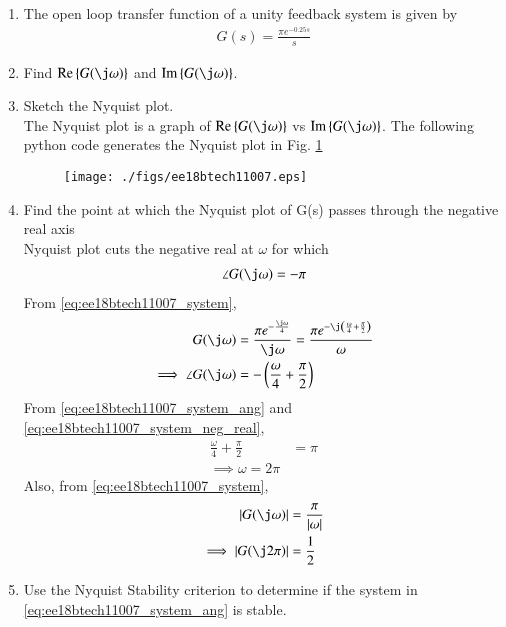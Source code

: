 \begin{enumerate}[label=\thesection.\arabic*.,ref=\thesection.\theenumi]
\item The open loop transfer function of a unity feedback system is given by
\begin{align}
\label{eq:ee18btech11007_system}
 G(s)=\frac{\pi e^{-0.25s}}{s}
\end{align}
\item Find $\text{Re} \cbrak{G(\j \omega)}$ and $\text{Im} \cbrak{G(\j \omega)}$.
\item Sketch the Nyquist plot.
\\
\solution The Nyquist plot is a graph of $\text{Re} \cbrak{G(\j \omega)}$  vs $\text{Im} \cbrak{G(\j \omega)}$.
The following python code generates the Nyquist plot in Fig.  \ref{fig:ee18btech11007}
%
\begin{figure}[!h]
  \texttt{[image: ./figs/ee18btech11007.eps]}
  \caption{}
  \label{fig:ee18btech11007}
\end{figure}
%
\item Find the point at which the Nyquist plot of G(s) passes through the negative real axis
\\
\solution  Nyquist plot cuts the negative real at $\omega $ for which 
\begin{align}
\angle G(\j\omega)=-\pi
\label{eq:ee18btech11007_system_neg_real}
\end{align}
From \eqref{eq:ee18btech11007_system},
\begin{align}
 G(\j\omega)&=\frac{\pi e^{-\frac{\j\omega}{4}}}{\j\omega} = \frac{\pi e^{-\j\brak{\frac{\omega}{4}+\frac{\pi}{2}}}}{\omega}
\\
\implies \angle{ G(\j\omega)} &= -\brak{\frac{\omega}{4}+\frac{\pi}{2}}
\label{eq:ee18btech11007_system_ang}
\end{align}
From \eqref{eq:ee18btech11007_system_ang} and \eqref{eq:ee18btech11007_system_neg_real}, 
\begin{align}
\frac{\omega}{4}+\frac{\pi}{2} &= \pi
\\
\implies \omega = 2\pi
\end{align}
Also, from \eqref{eq:ee18btech11007_system},
\begin{align}
\label{eq:ee18btech11007_system_mod}
\abs{ G(\j\omega)}&=\frac{\pi }{\abs{\omega}}
\\
\implies \abs{ G(\j2\pi)} &= \frac{1}{2}
\end{align}
%
\item Use the Nyquist Stability criterion to determine if the system in \eqref{eq:ee18btech11007_system_ang} is stable.

\end{enumerate}
